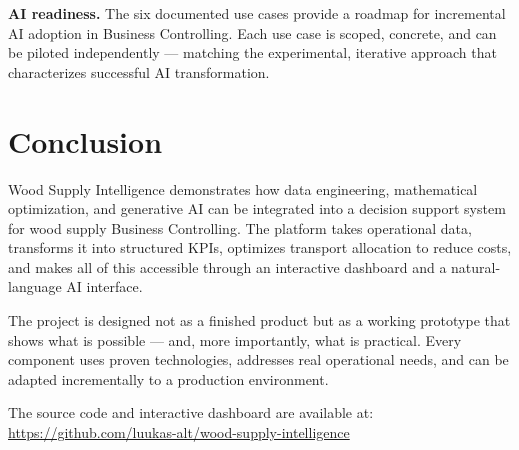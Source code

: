 \documentclass[11pt,a4paper]{article}
\begin{document}
\textbf{AI readiness.} The six documented use cases provide a roadmap for incremental AI adoption in Business Controlling. Each use case is scoped, concrete, and can be piloted independently --- matching the experimental, iterative approach that characterizes successful AI transformation.


\section{Conclusion}

Wood Supply Intelligence demonstrates how data engineering, mathematical optimization, and generative AI can be integrated into a decision support system for wood supply Business Controlling. The platform takes operational data, transforms it into structured KPIs, optimizes transport allocation to reduce costs, and makes all of this accessible through an interactive dashboard and a natural-language AI interface.

The project is designed not as a finished product but as a working prototype that shows what is possible --- and, more importantly, what is practical. Every component uses proven technologies, addresses real operational needs, and can be adapted incrementally to a production environment.

The source code and interactive dashboard are available at: \url{https://github.com/luukas-alt/wood-supply-intelligence}
\end{document}
